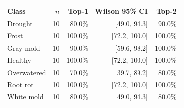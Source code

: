 \begin{tabular}{lrrrr}
\toprule
Class & $n$ & Top-1 & Wilson 95\% CI & Top-2 \\
\midrule
Drought & 10 & 80.0\% & [49.0, 94.3] & 90.0\% \\
Frost & 10 & 100.0\% & [72.2, 100.0] & 100.0\% \\
Gray mold & 10 & 90.0\% & [59.6, 98.2] & 100.0\% \\
Healthy & 10 & 100.0\% & [72.2, 100.0] & 100.0\% \\
Overwatered & 10 & 70.0\% & [39.7, 89.2] & 80.0\% \\
Root rot & 10 & 100.0\% & [72.2, 100.0] & 100.0\% \\
White mold & 10 & 80.0\% & [49.0, 94.3] & 80.0\% \\
\bottomrule
\end{tabular}
